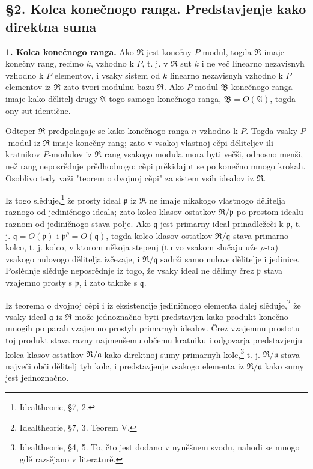 \documentclass[11pt]{article}
\begin{document}
\setcounter{footnote}{16}

\subsection*{\S 2. Kolca konečnogo ranga. Predstavjenje kako direktna suma}

\textbf{1. Kolca konečnogo ranga.} Ako $\mathfrak R$ jest konečny $P$-modul, togda $\mathfrak R$ imaje konečny rang, recimo $k$, vzhodno k $P$, t. j. v $\mathfrak R$ sut $k$ i ne več linearno nezavisnyh vzhodno k $P$ elementov, i vsaky sistem od $k$ linearno nezavisnyh vzhodno k $P$ elementov iz $\mathfrak R$ zato tvori modulnu bazu $\mathfrak R$. Ako $P$-modul $\mathfrak B$ konečnogo ranga imaje kako dělitelj drugy $\mathfrak A$ togo samogo konečnogo ranga, $\mathfrak B=O(\mathfrak A)$, togda ony sut identične.

Odteper $\mathfrak R$ predpolagaje se kako konečnogo ranga $n$ vzhodno k $P$. Togda vsaky $P$-modul iz $\mathfrak R$ imaje konečny rang; zato v vsakoj vlastnoj cěpi děliteljev ili kratnikov $P$-modulov iz $\mathfrak R$ rang vsakogo modula mora byti večši, odnosno menši, než rang neposrědnje prědhodnogo; cěpi prěkidajut se po konečno mnogo krokah. Osoblivo tedy važi "teorem o dvojnoj cěpi" za sistem vsih idealov iz $\mathfrak R$.

Iz togo slěduje,\footnote{Idealtheorie, \S 7, 2.} že prosty ideal $\mathfrak p$ iz $\mathfrak R$ ne imaje nikakogo vlastnogo dělitelja raznogo od jediničnogo ideala; zato kolco klasov ostatkov $\mathfrak R/\mathfrak p$ po prostom idealu raznom od jediničnogo stava polje. Ako $\mathfrak q$ jest primarny ideal prinadležeči k $\mathfrak p$, t. j. $\mathfrak q=O(\mathfrak p)$ i $\mathfrak p^{\rho}=O(\mathfrak q)$, togda kolco klasov ostatkov $\mathfrak R/\mathfrak q$ stava primarno kolco, t. j. kolco, v ktorom někoja stepenj (tu vo vsakom slučaju uže $\rho$-ta) vsakogo nulovogo dělitelja izčezaje, i $\mathfrak R/\mathfrak q$ sadrži samo nulove dělitelje i jedinice. Poslědnje slěduje neposrědnje iz togo, že vsaky ideal ne dělimy črez $\mathfrak p$ stava vzajemno prosty s $\mathfrak p$, i zato takože s $\mathfrak q$.

Iz teorema o dvojnoj cěpi i iz eksistencije jediničnogo elementa dalej slěduje,\footnote{Idealtheorie, \S 7, 3. Teorem V.} že vsaky ideal $\mathfrak a$ iz $\mathfrak R$ može jednoznačno byti predstavjen kako produkt konečno mnogih po parah vzajemno prostyh primarnyh idealov. Črez vzajemnu prostotu toj produkt stava ravny najmenšemu občemu kratniku i odgovarja predstavjenju kolca klasov ostatkov $\mathfrak R/\mathfrak a$ kako direktnoj sumy primarnyh kolc,\footnote{Idealtheorie, \S 4, 5. To, čto jest dodano v nyněšnem svodu, nahodi se mnogo gdě razsějano v literaturě.} t. j. $\mathfrak R/\mathfrak a$ stava največi obči dělitelj tyh kolc, i predstavjenje vsakogo elementa iz $\mathfrak R/\mathfrak a$ kako sumy jest jednoznačno.
\end{document}
